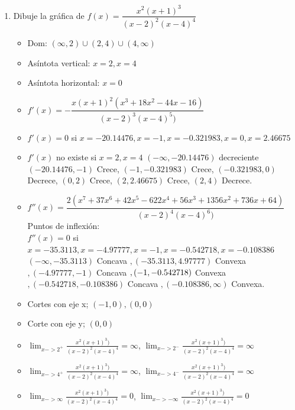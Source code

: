\documentclass{report}
\begin{document}
\begin{enumerate}
        \item Dibuje la gráfica de $f(x)= \dfrac{x^2(x+1)^3}{(x-2)^2(x-4)^4}$\\
        \begin{itemize}
            \item Dom: $(\infty, 2) \cup (2,4) \cup (4, \infty)$
            \item Asíntota vertical: $x=2, x=4$
            \item Asíntota horizontal: $x=0$
            \item $f'(x)=  -\dfrac{x (x+1)^2 (x^3 + 18x^2 - 44x - 16)}{(x-2)^3 (x-4)^5)}$
            \item  $f'(x)=0$ si $x=-20.14476, x=-1, x=-0.321983, x=0,x= 2.46675 $\\
            \item $f'(x)$ no existe si $x=2, x=4$
            $(-\infty, -20.14476)$ decreciente\\
            $(-20.14476, -1)$ Crece,
            $(-1,-0.321983)$ Crece,
            $(-0.321983, 0)$ Decrece,
            $(0,2)$ Crece,
            $(2,2.46675)$ Crece,
            $(2,4)$ Decrece.
            \item $f''(x)=\dfrac{2 (x^7 + 37 x^6 + 42 x^5 - 622 x^4 + 56 x^3 + 1356 x^2 + 736 x + 64)}{(x-2)^4 (x-4)^6)}$
            Puntos de inflexión:
            \\$f''(x)=0$ si $x=-35.3113,x=-4.97777, x=-1, x=-0.542718, x=-0.108386$\\
            $(-\infty, -35.3113)$ Concava $,
            (-35.3113,4.97777)$ Convexa $,
            (-4.97777,-1)$ Concava $,\\
            (-1, -0.542718)$ Convexa$,
            (-0.542718,-0.108386 )$ Concava $,
            (-0.108386, \infty)$ Convexa.
            \item Cortes con eje x; $(-1,0), (0,0) $
            \item Corte con eje y; $(0,0)$
            \item $\lim_{x->2^+} \frac{x^2 (x + 1)^3)}{(x - 2)^2 (x - 4)^4} = \infty$, $\lim_{x->2^-} \frac{x^2 (x + 1)^3)}{(x - 2)^2 (x - 4)^4} = \infty$
            \item $\lim_{x->4^+} \frac{x^2 (x + 1)^3)}{(x - 2)^2 (x - 4)^4} = \infty$, $\lim_{x->4^-} \frac{x^2 (x + 1)^3)}{(x - 2)^2 (x - 4)^4} = \infty$
            \item $\lim_{x->\infty} \frac{x^2 (x + 1)^3)}{(x - 2)^2 (x - 4)^4} = 0$, $\lim_{x->-\infty} \frac{x^2 (x + 1)^3)}{(x - 2)^2 (x - 4)^4} = 0$
    

\end{itemize}
\end{enumerate}
\end{document}
